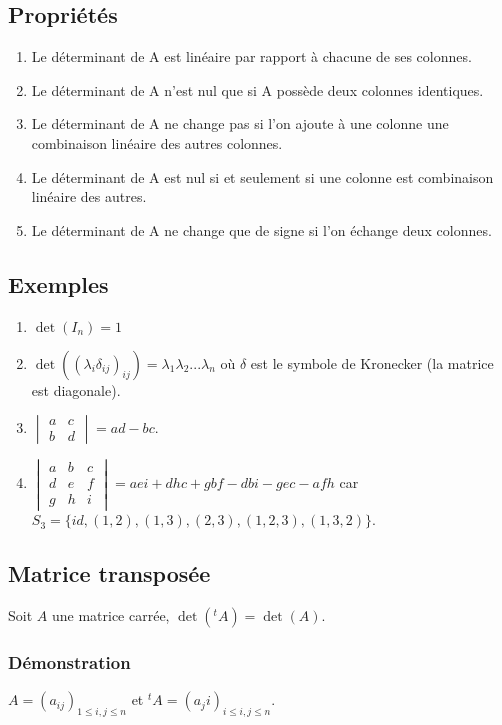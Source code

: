 \documentclass[a4paper,10pt]{book} %
\begin{document}
\subsection{Propriétés}\label{propriétés}
\begin{enumerate}
\item Le déterminant de A est linéaire par rapport à chacune de ses colonnes.
\item Le déterminant de A n'est nul que si A possède deux colonnes identiques.
\item Le déterminant de A ne change pas si l'on ajoute à une colonne une combinaison linéaire des autres colonnes.
\item Le déterminant de A est nul si et seulement si une colonne est combinaison linéaire des autres.
\item Le déterminant de A ne change que de signe si l'on échange deux colonnes.
\end{enumerate}

\subsection{Exemples}
\begin{enumerate}
\item $\det(I_n)=1$
\item $\det((\lambda_i\delta_{ij})_{ij})=\lambda_1\lambda_2...\lambda_{n}$ où $\delta$ est le symbole de Kronecker (la matrice est diagonale).
\item $\begin{vmatrix}
a&c\\b&d
\end{vmatrix}=ad-bc$.
\item $\begin{vmatrix}
a&b&c\\d&e&f\\
g&h&i
\end{vmatrix}=aei+dhc+gbf-dbi-gec-afh$ car $S_3=\{id,(1,2),(1,3),(2,3),(1,2,3),(1,3,2)\}$.
\end{enumerate}

\subsection{Matrice transposée}
Soit $A$ une matrice carrée, $\det({}^tA)=\det(A)$.

\subsubsection{Démonstration}
$A=(a_{ij})_{1\leq i,j\leq n}$ et ${}^tA=(a_ji)_{i\leq i,j\leq n}$.\\
\end{document}
